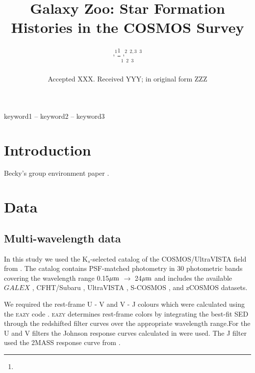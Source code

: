 \documentclass[a4paper,fleqn,usenatbib]{mnras}
\title[COSMOS SFHs]{Galaxy Zoo: Star Formation Histories in the COSMOS Survey}
\author[]{
,$^{1}$\thanks{}
,$^{2}$
$^{2,3}$
$^{3}$
\\
$^{1}$
$^{2}$
$^{3}$
}
\date{Accepted XXX. Received YYY; in original form ZZZ}
\begin{document}
\label{firstpage}
\pagerange{\pageref{firstpage}--\pageref{lastpage}}
\maketitle

\begin{abstract}


\end{abstract}

\begin{keywords}
keyword1 -- keyword2 -- keyword3
\end{keywords}



\section{Introduction}
Becky's group environment paper \cite{smethurst2017galaxy}.
\section{Data}
   
   \subsection{Multi-wavelength data}
   
   In this study we used the K$_{s}$-selected catalog of the COSMOS/UltraVISTA field from \cite{muzzin2013public}.  
   The catalog contains PSF-matched photometry in 30 photometric bands covering the wavelength range 0.15$\hbox{$\mu$m}$ 
   $\rightarrow$ 24$\hbox{$\mu$m}$ and includes the available $GALEX$ \citep{martin2005}, CFHT/Subaru \citep{capak2007}, 
   UltraVISTA \citep{mcCraken2012}, S-COSMOS \citep{sanders2007}, and zCOSMOS \citep{lilly2009} datasets.

   We required the rest-frame U - V and V - J colours which were calculated using the \textsc{eazy} code 
   \citep{eazycode}. \textsc{eazy} determines rest-frame colors by integrating the best-fit SED through the redshifted filter curves
over the appropriate wavelength range.For the U and V filters the Johnson response curves calculated in \cite{maiz2006} 
   were used. The J filter used the 2MASS response curve from \cite{2mass2006}.
 
\end{document}
